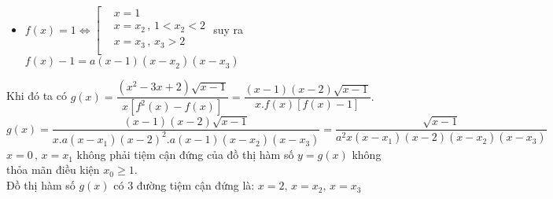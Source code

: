 \begin{ex}
{\begin{itemize}
			\item $f\left(x\right)=1\Leftrightarrow \left[ \begin{aligned}
				& x=1 \\ 
				& x=x_2^{}\,,\,1<x_2^{}<2 \\ 
				& x=x_3^{}\,,\,x_3^{}>2 \\ 
			\end{aligned} \right.$ suy ra $f\left(x \right)-1=a\left(x-1\right)\left(x-x_2^{} \right)\left(x-x_3^{}\right)$
		\end{itemize}
		Khi đó ta có $g\left(x \right)=\dfrac{\left(x^2-3x+2 \right)\sqrt{x-1}}{x\left[f^2\left(x \right)-f\left(x\right) \right]}=\dfrac{\left(x-1\right)\left(x-2 \right)\sqrt{x-1}}{x.f\left(x\right)\left[ f\left(x\right)-1\right]}.$\\
		$g\left(x\right)=\dfrac{\left(x-1\right)\left(x-2\right)\sqrt{x-1}}{x.a\left(x-x_1^{} \right){{\left(x-2\right)}^2}.a\left(x-1 \right)\left(x-x_2^{}\right)\left(x-x_3^{} \right)}=\dfrac{\sqrt{x-1}}{a^2x\left( x-x_1^{}\right)\left(x-2\right)\left( x-x_2^{}\right)\left(x-x_3^{}\right)}$\\
		$x=0\,,\,x=x_1^{}$ không phải tiệm cận đứng của đồ thị hàm số $y=g\left( x \right)$ không thỏa mãn điều kiện $x_0^{}\ge 1$.\\
		Đồ thị hàm số $g\left( x \right)$ có $3$ đường tiệm cận đứng là: $x=2,\,x=x_2^{},\,x=x_3^{}$}
\end{ex}
